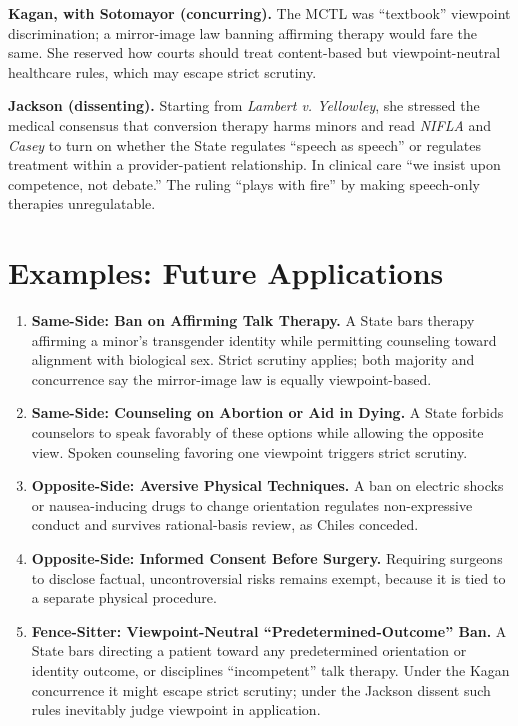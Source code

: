 \documentclass[12pt]{article}
\begin{document}
\textbf{Kagan, with Sotomayor (concurring).} The MCTL was ``textbook'' viewpoint discrimination; a mirror-image law banning affirming therapy would fare the same. She reserved how courts should treat content-based but viewpoint-neutral healthcare rules, which may escape strict scrutiny.

\textbf{Jackson (dissenting).} Starting from \textit{Lambert v. Yellowley}, she stressed the medical consensus that conversion therapy harms minors and read \textit{NIFLA} and \textit{Casey} to turn on whether the State regulates ``speech as speech'' or regulates treatment within a provider-patient relationship. In clinical care ``we insist upon competence, not debate.'' The ruling ``plays with fire'' by making speech-only therapies unregulatable.

\section{Examples: Future Applications}

\begin{enumerate}
\item \textbf{Same-Side: Ban on Affirming Talk Therapy.} A State bars therapy affirming a minor's transgender identity while permitting counseling toward alignment with biological sex. Strict scrutiny applies; both majority and concurrence say the mirror-image law is equally viewpoint-based.
\item \textbf{Same-Side: Counseling on Abortion or Aid in Dying.} A State forbids counselors to speak favorably of these options while allowing the opposite view. Spoken counseling favoring one viewpoint triggers strict scrutiny.
\item \textbf{Opposite-Side: Aversive Physical Techniques.} A ban on electric shocks or nausea-inducing drugs to change orientation regulates non-expressive conduct and survives rational-basis review, as Chiles conceded.
\item \textbf{Opposite-Side: Informed Consent Before Surgery.} Requiring surgeons to disclose factual, uncontroversial risks remains exempt, because it is tied to a separate physical procedure.
\item \textbf{Fence-Sitter: Viewpoint-Neutral ``Predetermined-Outcome'' Ban.} A State bars directing a patient toward any predetermined orientation or identity outcome, or disciplines ``incompetent'' talk therapy. Under the Kagan concurrence it might escape strict scrutiny; under the Jackson dissent such rules inevitably judge viewpoint in application.
\end{enumerate}
\end{document}
